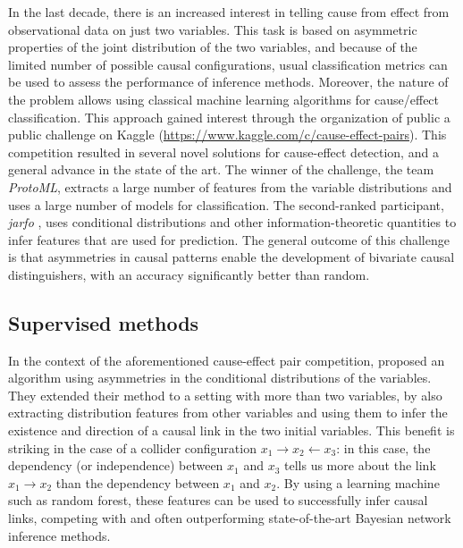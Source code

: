 In the last decade, there is an increased interest in telling cause from effect
from observational data on just two variables. This task is based on asymmetric
properties of the joint distribution of the two variables, and because of the
limited number of possible causal configurations, usual classification metrics
can be used to assess the performance of inference methods. Moreover, the nature
of the problem allows using classical machine learning algorithms for
cause/effect classification. This approach gained interest through the
organization of public a public challenge on Kaggle
(\url{https://www.kaggle.com/c/cause-effect-pairs}). This competition resulted
in several novel solutions for cause-effect detection, and a general advance in
the state of the art. The winner of the challenge, the team \emph{ProtoML},
extracts a large number of features from the variable distributions and uses a
large number of models for classification. The second-ranked participant,
\emph{jarfo} \cite{fonollosa2016conditional}, uses conditional distributions and
other information-theoretic quantities to infer features that are used for
prediction. The general outcome of this challenge is that asymmetries in causal
patterns enable the development of bivariate causal distinguishers, with an
accuracy significantly better than random.

\subsection{Supervised methods}

In the context of the aforementioned cause-effect pair competition,
\textcite{bontempi2015dependency} proposed an algorithm using asymmetries in the
conditional distributions of the variables. They extended their method to a
setting with more than two variables, by also extracting distribution features
from other variables and using them to infer the existence and direction of a
causal link in the two initial variables. This benefit is striking in the case
of a collider configuration $x_1 \rightarrow x_2 \leftarrow x_3$: in this case,
the dependency (or independence) between $x_1$ and $x_3$ tells us more about the
link $x_1 \rightarrow x_2$ than the dependency between $x_1$ and $x_2$. By using
a learning machine such as random forest, these features can be used to
successfully infer causal links, competing with and often outperforming
state-of-the-art Bayesian network inference methods.
